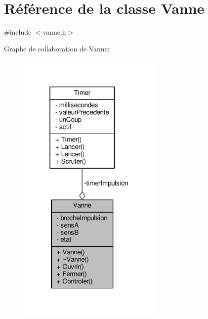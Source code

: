 \hypertarget{class_vanne}{}\section{Référence de la classe Vanne}
\label{class_vanne}


{\ttfamily \#include $<$vanne.\+h$>$}



Graphe de collaboration de Vanne\+:\nopagebreak
\begin{figure}[H]
\begin{center}
\leavevmode
\includegraphics[width=199pt]{class_vanne__coll__graph}
\end{center}
\end{figure}
